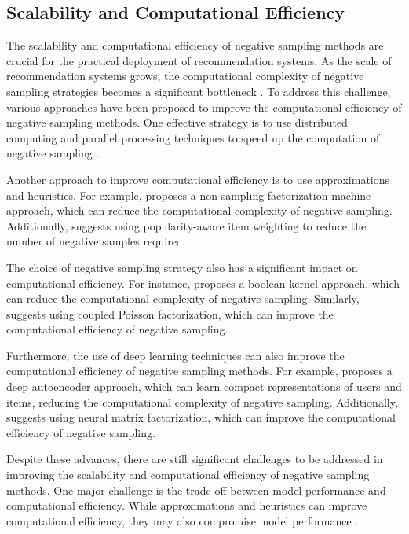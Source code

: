 \documentclass[11pt,a4paper]{article}
\begin{document}
\subsection{Scalability and Computational Efficiency}


The scalability and computational efficiency of negative sampling methods are crucial for the practical deployment of recommendation systems. As the scale of recommendation systems grows, the computational complexity of negative sampling strategies becomes a significant bottleneck \cite{doi:10.1609/aaai.v34i04.5751}. To address this challenge, various approaches have been proposed to improve the computational efficiency of negative sampling methods. One effective strategy is to use distributed computing and parallel processing techniques to speed up the computation of negative sampling \cite{doi:10.1145/3097983.3098202}. 

Another approach to improve computational efficiency is to use approximations and heuristics. For example, \cite{doi:10.1145/3366423.3380303} proposes a non-sampling factorization machine approach, which can reduce the computational complexity of negative sampling. Additionally, \cite{arxiv:1802.05382} suggests using popularity-aware item weighting to reduce the number of negative samples required. 

The choice of negative sampling strategy also has a significant impact on computational efficiency. For instance, \cite{doi:10.1016/j.neucom.2018.01.057} proposes a boolean kernel approach, which can reduce the computational complexity of negative sampling. Similarly, \cite{doi:10.1609/aaai.v32i1.11689} suggests using coupled Poisson factorization, which can improve the computational efficiency of negative sampling.

Furthermore, the use of deep learning techniques can also improve the computational efficiency of negative sampling methods. For example, \cite{doi:10.1109/access.2019.2905534} proposes a deep autoencoder approach, which can learn compact representations of users and items, reducing the computational complexity of negative sampling. Additionally, \cite{doi:10.1155/2022/9593957} suggests using neural matrix factorization, which can improve the computational efficiency of negative sampling.

Despite these advances, there are still significant challenges to be addressed in improving the scalability and computational efficiency of negative sampling methods. One major challenge is the trade-off between model performance and computational efficiency. While approximations and heuristics can improve computational efficiency, they may also compromise model performance \cite{doi:10.1145/3434185}. 
\end{document}
